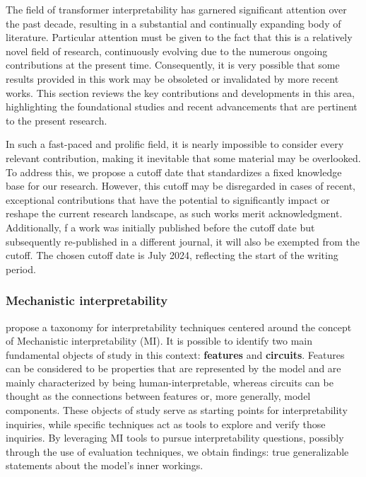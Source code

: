 The field of transformer interpretability has garnered significant attention over the past decade, resulting in a substantial and continually expanding body of literature.
Particular attention must be given to the fact that this is a relatively novel field of research, continuously evolving due to the numerous ongoing contributions at the present time.
Consequently, it is very possible that some results provided in this work may be obsoleted or invalidated by more recent works.
This section reviews the key contributions and developments in this area, highlighting the foundational studies and recent advancements that are pertinent to the present research.

In such a fast-paced and prolific field, it is nearly impossible to consider every relevant contribution, making it inevitable that some material may be overlooked.
To address this, we propose a cutoff date that standardizes a fixed knowledge base for our research.
However, this cutoff may be disregarded in cases of recent, exceptional contributions that have the potential to significantly impact or reshape the current research landscape, as such works merit acknowledgment.
Additionally,  f a work was initially published before the cutoff date but subsequently re-published in a different journal, it will also be exempted from the cutoff.
The chosen cutoff date is July 2024, reflecting the start of the writing period.

\subsubsection*{Mechanistic interpretability}

\citet{rai2024} propose a taxonomy for interpretability techniques centered around the concept of Mechanistic interpretability (MI).
It is possible to identify two main fundamental objects of study in this context: \textbf{features} and \textbf{circuits}.
Features can be considered to be properties that are represented by the model and are mainly characterized by being human-interpretable, whereas circuits can be thought as the connections between features or, more generally, model components.
These objects of study serve as starting points for interpretability inquiries, while specific techniques act as tools to explore and verify those inquiries.
By leveraging MI tools to pursue interpretability questions, possibly through the use of evaluation techniques, we obtain findings: true generalizable statements about the model's inner workings.

